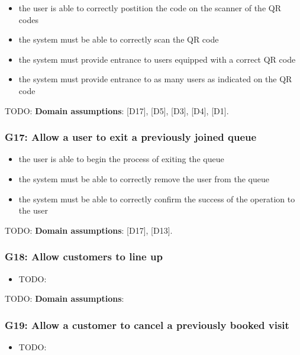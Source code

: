 \begin{itemize}[topsep=0pt]
    \item the user is able to correctly postition the code on the scanner of the QR codes
    \item the system must be able to correctly scan the QR code
    \item the system must  provide entrance to users equipped with a correct QR code 
    \item the system must provide entrance to as many users as indicated on the QR code
\end{itemize}

TODO: \textbf{Domain assumptions}: [D17], [D5], [D3], [D4], [D1].

\subsubsection{G17: Allow a user to exit a previously joined queue}
\label{subsubsect:G17}

\begin{itemize}[topsep=0pt]
    \item the user is able to begin the process of exiting the queue
    \item the system must be able to correctly remove the user from the queue
    \item the system must be able to correctly confirm the success of the operation to the user
\end{itemize}

TODO: \textbf{Domain assumptions}: [D17], [D13]. 

\subsubsection{G18: Allow customers to line up}
\label{subsubsect:G18}

\begin{itemize}[topsep=0pt]
    \item TODO:
\end{itemize}

TODO: \textbf{Domain assumptions}: 

\subsubsection{G19: Allow a customer to cancel a previously booked visit}
\label{subsubsect:G19}

\begin{itemize}[topsep=0pt]
    \item TODO:
\end{itemize}

